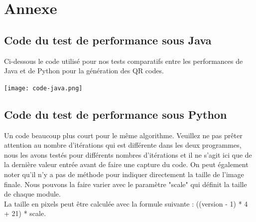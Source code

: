 \documentclass[a4paper,12pt]{article}
\begin{document}
\begin{itemize}

\end{itemize}

\newpage
\section{Annexe}

\subsection{Code du test de performance sous Java}
\noindent Ci-dessous le code utilisé pour nos tests comparatifs entre les performances de Java et de Python pour la génération des QR codes.

\noindent\texttt{[image: code-java.png]}

\newpage
\subsection{Code du test de performance sous Python}
\noindent Un code beaucoup plus court pour le même algorithme. Veuillez ne pas prêter attention au nombre d'itérations qui est différente dans les deux programmes, nous les avons testés pour différents nombres d'itérations et il ne s'agit ici que de la dernière valeur entrée avant de faire une capture du code.
On peut également noter qu'il n'y a pas de méthode pour indiquer directement la taille de l'image finale. Nous pouvons la faire varier avec le paramètre "scale" qui définit la taille de chaque module.\\
La taille en pixels peut être calculée avec la formule suivante : ((version - 1) * 4 + 21) * scale.\\
\end{document}

